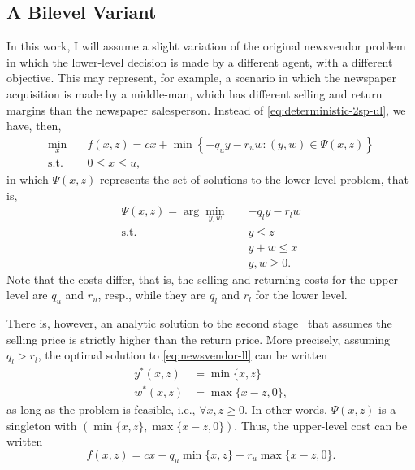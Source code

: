 \documentclass[12pt]{article}
\begin{document}
\subsection*{A Bilevel Variant}

In this work, I will assume a slight variation of the original newsvendor problem in which the lower-level decision is made by a different agent, with a different objective.
This may represent, for example, a scenario in which the newspaper acquisition is made by a middle-man, which has different selling and return margins than the newspaper salesperson. 
Instead of \eqref{eq:deterministic-2sp-ul}, we have, then,
\begin{equation}\label{eq:newsvendor-ul}
\begin{split}
    \min_{x} \quad & f(x,z) = cx + \min\left\{ -q_u y -r_u w : (y,w)\in \Psi(x,z) \right\}  \\
    \textrm{s.t.} \quad & 0\le x\le u
,\end{split}
\end{equation}
in which $\Psi(x,z)$ represents the set of solutions to the lower-level problem, that is,
\begin{equation}\label{eq:newsvendor-ll}
\begin{split}
    \Psi(x,z) = \arg\min_{y,w} \quad & -q_l y - r_l w \\
    \textrm{s.t.} \quad & y\le z \\
      & y+w \le x \\
      & y,w \ge 0
.\end{split}
\end{equation}
Note that the costs differ, that is, the selling and returning costs for the upper level are $q_u$ and $r_u$, resp., while they are $q_l$ and $r_l$ for the lower level.

There is, however, an analytic solution to the second stage~\citep{birgeIntroductionStochasticProgramming2011} that assumes the selling price is strictly higher than the return price.
More precisely, assuming $q_l > r_l$, the optimal solution to \eqref{eq:newsvendor-ll} can be written
\begin{align}\label{eq:newsvendor-analytic-solution}
    y^{*}(x,z) &= \min\{x,z\} \\
    w^{*}(x,z) &= \max\{x-z, 0\}
,\end{align}
as long as the problem is feasible, i.e., $\forall x,z \ge 0$.
In other words, $\Psi(x,z)$ is a singleton with  $(\min\{x,z\},\max\{x-z, 0\})$.
Thus, the upper-level cost can be written
\begin{equation}\label{eq:newsvendor-analytic-ul-cost}
    f(x,z) = cx -q_u \min\{x,z\} - r_u \max\{x-z, 0\}
.\end{equation}
\end{document}
